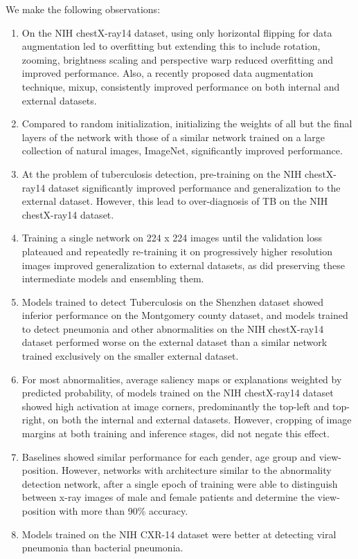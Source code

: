 \documentclass[12pt,oneside,a4paper]{report}
\begin{document}
We make the following observations:
\begin{enumerate}
\item{ On the NIH chestX-ray14 dataset, using only horizontal flipping for data
    augmentation led to overfitting but extending this to include rotation,
    zooming, brightness scaling and perspective warp reduced overfitting and
    improved performance. Also, a recently proposed data augmentation technique,
    mixup\cite{Zhang2017}, consistently improved performance on both internal
    and external datasets.}

\item{ Compared to random initialization, initializing the weights of all but
    the final layers of the network with those of a similar network trained on a
    large collection of natural images, ImageNet, significantly improved
    performance. }

\item{ At the problem of tuberculosis detection, pre-training on the NIH
    chestX-ray14 dataset significantly improved performance and generalization
    to the external dataset. However, this lead to over-diagnosis of TB on the
    NIH chestX-ray14 dataset. }

\item{ Training a single network on 224 x 224 images until the validation loss
    plateaued and repeatedly re-training it on progressively higher resolution
    images improved generalization to external datasets, as did preserving these
    intermediate models and ensembling them\cite{VanNoord2017}.}

\item{ Models trained to detect Tuberculosis on the Shenzhen dataset showed
    inferior performance on the Montgomery county dataset, and models trained to
    detect pneumonia and other abnormalities on the NIH chestX-ray14 dataset
    performed worse on the external dataset than a similar network trained
    exclusively on the smaller external dataset. }

\item{For most abnormalities, average saliency maps or explanations weighted by
    predicted probability, of models trained on the NIH chestX-ray14 dataset
    showed high activation at image corners, predominantly the top-left and
    top-right, on both the internal and external datasets. However, cropping of
    image margins at both training and inference stages, did not negate this
    effect. }
  
\item{ Baselines showed similar performance for each gender, age group and
    view-position. However, networks with architecture similar to the
    abnormality detection network, after a single epoch of training were able to
    distinguish between x-ray images of male and female patients and determine
    the view-position with more than 90\% accuracy. }

\item{Models trained on the NIH CXR-14 dataset were better at
	detecting viral pneumonia than bacterial pneumonia.}

\end{enumerate}\\
\end{document}
